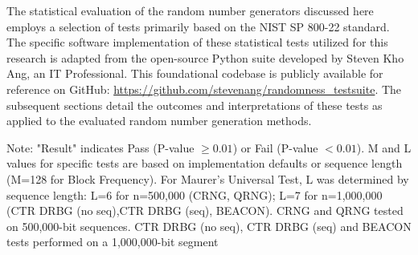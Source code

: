 The statistical evaluation of the random number generators discussed here employs a selection of tests primarily based on the NIST SP 800-22 standard. The specific software implementation of these statistical tests utilized for this research is adapted from the open-source Python suite developed by Steven Kho Ang, an IT Professional. This foundational codebase is publicly available for reference on GitHub: \url{https://github.com/stevenang/randomness_testsuite}. The subsequent sections detail the outcomes and interpretations of these tests as applied to the evaluated random number generation methods.

\begin{table}[htbp]
\centering
\caption{Summary of NIST SP 800-22 Rev 1a Test Results for Various RNGs ($\alpha = 0.01$)}
\label{tab:nist_results_all_five_rngs}
\begin{flushleft}
\footnotesize Note: "Result" indicates Pass (P-value $\ge 0.01$) or Fail (P-value $< 0.01$). M and L values for specific tests are based on implementation defaults or sequence length (M=128 for Block Frequency). For Maurer's Universal Test, L was determined by sequence length: L=6 for n=500,000 (CRNG, QRNG); L=7 for n=1,000,000 (CTR DRBG (no seq),CTR DRBG (seq), BEACON). CRNG and QRNG tested on 500,000-bit sequences. CTR DRBG (no seq), CTR DRBG (seq) and BEACON tests performed on a 1,000,000-bit segment
\end{flushleft}
\end{table}

